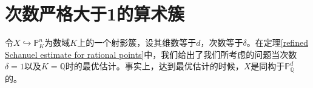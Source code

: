 


\section{次数严格大于1的算术簇}
\label{HB conjecture}
令$X\hookrightarrow\mathbb{P}^n_K$为数域$K$上的一个射影簇，设其维数等于$d$，次数等于$\delta$。在定理\ref{refined Schanuel estimate for rational points}中，我们给出了我们所考虑的问题当次数$\delta = 1$以及$K = \mathbb{Q}$时的最优估计。事实上，达到最优估计的时候，$X$是同构于$\mathbb{P}^d_{\mathbb{Q}}$的。

